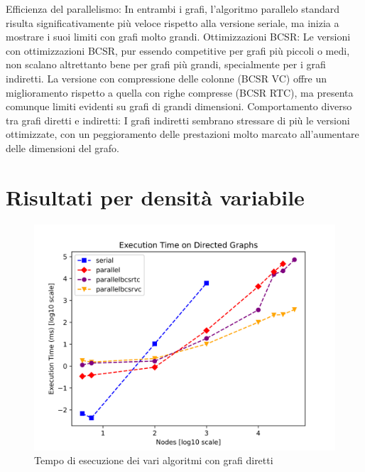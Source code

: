         

        Efficienza del parallelismo: In entrambi i grafi, l'algoritmo parallelo standard risulta significativamente più veloce rispetto alla versione seriale, ma inizia a mostrare i suoi limiti con grafi molto grandi.
        Ottimizzazioni BCSR: Le versioni con ottimizzazioni BCSR, pur essendo competitive per grafi più piccoli o medi, non scalano altrettanto bene per grafi più grandi, specialmente per i grafi indiretti. La versione con compressione delle colonne (BCSR VC) offre un miglioramento rispetto a quella con righe compresse (BCSR RTC), ma presenta comunque limiti evidenti su grafi di grandi dimensioni.
        Comportamento diverso tra grafi diretti e indiretti: I grafi indiretti sembrano stressare di più le versioni ottimizzate, con un peggioramento delle prestazioni molto marcato all'aumentare delle dimensioni del grafo.
    
    
    
    
    
    
    \section{Risultati per densità variabile}

    

    \begin{figure}
        \centering
        \includegraphics[width=0.7\linewidth]{images/execution_time_directed.png}
        \caption{Tempo di esecuzione dei vari algoritmi con grafi diretti}
        \label{fig:exec-time-dir}
    \end{figure}


